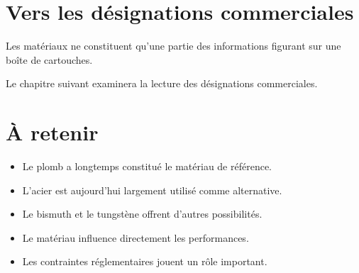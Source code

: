 \section{Vers les désignations commerciales}

Les matériaux ne constituent qu'une partie des informations figurant sur une
boîte de cartouches.

Le chapitre suivant examinera la lecture des désignations commerciales.

\section{À retenir}

\begin{aretenir}

\begin{itemize}
    \item Le plomb a longtemps constitué le matériau de référence.
    \item L'acier est aujourd'hui largement utilisé comme alternative.
    \item Le bismuth et le tungstène offrent d'autres possibilités.
    \item Le matériau influence directement les performances.
    \item Les contraintes réglementaires jouent un rôle important.
\end{itemize}

\end{aretenir}
